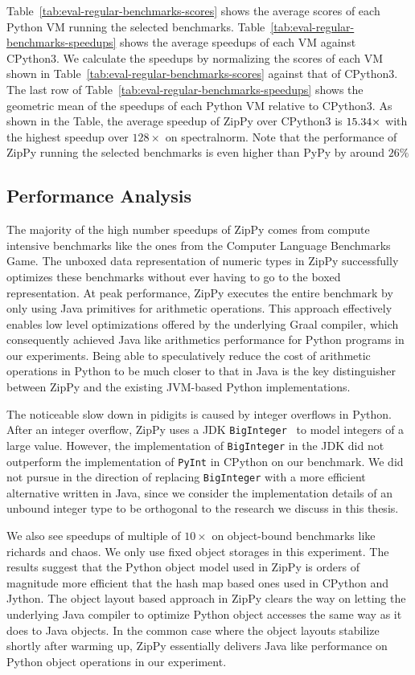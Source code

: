 Table~\ref{tab:eval-regular-benchmarks-scores} shows the average scores of each Python VM running the selected benchmarks.
Table~\ref{tab:eval-regular-benchmarks-speedups} shows the average speedups of each VM against CPython3.
We calculate the speedups by normalizing the scores of each VM shown in Table~\ref{tab:eval-regular-benchmarks-scores} against that of CPython3.
The last row of Table~\ref{tab:eval-regular-benchmarks-speedups} shows the geometric mean of the speedups of each Python VM relative to CPython3.
As shown in the Table, the average speedup of ZipPy over CPython3 is $15.34{}\times$ with the highest speedup over $128\times$ on \textsf{spectralnorm}.
Note that the performance of ZipPy running the selected benchmarks is even higher than PyPy by around $26\%$

\subsection{Performance Analysis}

The majority of the high number speedups of ZipPy comes from compute intensive benchmarks like the ones from the Computer Language Benchmarks Game.
The unboxed data representation of numeric types in ZipPy successfully optimizes these benchmarks without ever having to go to the boxed representation.
At peak performance, ZipPy executes the entire benchmark by only using Java primitives for arithmetic operations.
This approach effectively enables low level optimizations offered by the underlying Graal compiler, which consequently achieved Java like arithmetics performance for Python programs in our experiments.
Being able to speculatively reduce the cost of arithmetic operations in Python to be much closer to that in Java is the key distinguisher between ZipPy and the existing JVM-based Python implementations.

The noticeable slow down in \textsf{pidigits} is caused by integer overflows in Python.
After an integer overflow, ZipPy uses a JDK \texttt{BigInteger}~\cite{hotspot} to model integers of a large value.
However, the implementation of \texttt{BigInteger} in the JDK did not outperform the implementation of \texttt{PyInt} in CPython on our benchmark.
We did not pursue in the direction of replacing \texttt{BigInteger} with a more efficient alternative written in Java, since we consider the implementation details of an unbound integer type to be orthogonal to the research we discuss in this thesis.

We also see speedups of multiple of $10\times$ on object-bound benchmarks like \textsf{richards} and \textsf{chaos}.
We only use fixed object storages in this experiment.
The results suggest that the Python object model used in ZipPy is orders of magnitude more efficient that the hash map based ones used in CPython and Jython.
The object layout based approach in ZipPy clears the way on letting the underlying Java compiler to optimize Python object accesses the same way as it does to Java objects.
In the common case where the object layouts stabilize shortly after warming up, ZipPy essentially delivers Java like performance on Python object operations in our experiment.

